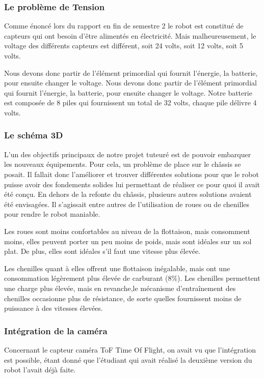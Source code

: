\documentclass{PackagerQualityN}
\begin{document}
\subsubsection{Le problème de Tension}
Comme énoncé lors du rapport en fin de semestre 2 le robot est constitué de capteurs qui ont besoin d’être alimentés en électricité. Mais malheureusement, le voltage des différents capteurs est différent, soit 24 volts, soit 12 volts, soit 5 volts.

Nous devons donc partir de l’élément primordial qui fournit l’énergie, la batterie, pour ensuite changer le voltage. Nous devons donc partir de l’élément primordial qui fournit l’énergie, la batterie, pour ensuite changer le voltage. Notre batterie est composée de 8 piles qui fournissent un total de 32 volts, chaque pile délivre 4 volts.

\subsubsection{Le schéma 3D}
L’un des objectifs principaux de notre projet tuteuré est de pouvoir embarquer les nouveaux équipements. Pour cela, un problème de place sur le châssis se posait. Il fallait donc l’améliorer et trouver différentes solutions pour que le robot puisse avoir des fondements solides lui permettant de réaliser ce pour quoi il avait été conçu. 
En dehors de la refonte du châssis, plusieurs autres solutions avaient été envisagées. Il s’agissait entre autres de l’utilisation de roues ou de chenilles pour rendre le robot maniable.

Les roues sont moins confortables au niveau de la flottaison, mais consomment moins, elles peuvent porter un peu moins de poids, mais sont idéales sur un sol plat. De plus, elles sont idéales s’il faut une vitesse plus élevée.

Les chenilles quant à elles offrent une flottaison inégalable, mais ont une consommation légèrement plus élevée de carburant (8\%). Les chenilles permettent une charge plus élevée, mais en revanche,le mécanisme d’entraînement des chenilles occasionne plus de résistance, de sorte quelles fournissent moins de puissance à des vitesses élevées.

\subsubsection{Intégration de la caméra}
Concernant le capteur caméra ToF Time Of Flight, on avait vu que l’intégration est possible, étant donné que l’étudiant qui avait réalisé la deuxième version du robot l’avait déjà faite.
\end{document}
